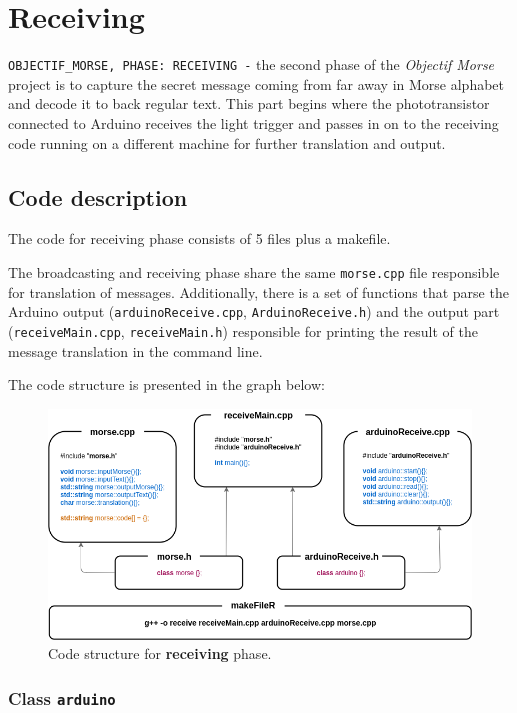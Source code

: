 \documentclass[12pt]{report}
\begin{document}
\newpage

\chapter{Receiving}

\verb|OBJECTIF_MORSE, PHASE: RECEIVING -| the second phase of the \textit{Objectif Morse} project is to capture the secret message coming from far away in Morse alphabet and decode it to back regular text. This part begins where the phototransistor connected to Arduino receives the light trigger and passes in on to the receiving code running on a different machine for further translation and output.

\section{Code description}

The code for receiving phase consists of 5 files plus a makefile. 

The broadcasting and receiving phase share the same \verb|morse.cpp| file responsible for translation of messages. Additionally, there is a set of functions that parse the Arduino output (\verb|arduinoReceive.cpp|, \verb|ArduinoReceive.h|) and the output part (\verb|receiveMain.cpp|, \verb|receiveMain.h|) responsible for printing the result of the message translation in the command line.

The code structure is presented in the graph below:

\begin{figure}[H]
\centering\includegraphics[width=14.5cm]{rCodeStructure}
\caption{Code structure for \textbf{receiving} phase.}	
\label{fig:re_code}
\end{figure}


\subsection{Class \texttt{arduino}}
\end{document}
